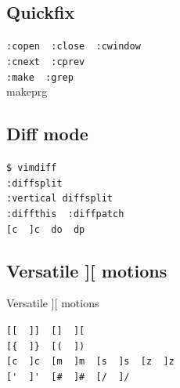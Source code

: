 \documentclass[14pt,svgnames,compress]{beamer}
\newcommand\hl[1]{\textcolor{HlColor}{#1}}
\newcommand\framesubtitlefontsize{\huge}
\newcommand\singleframesubtitle[1]{
    \begin{center}
        \framesubtitlefontsize #1
    \end{center}
}
\newcommand\subtitleframe{
    \begin{frame}
        \singleframesubtitle{\insertsubsectionhead}
    \end{frame}
}
\begin{document}
\subsection{Quickfix}

\subtitleframe

\begin{frame}[fragile]
    \begin{spacing}{1.5} %
        \large
        \centering
        \verb|:copen  :close  :cwindow| \\ \bigskip
        \verb|:cnext  :cprev| \\
        \vspace{1cm}
        \verb|:make  :grep| \\ \bigskip
        \hl{makeprg} \\
    \end{spacing}
\end{frame}


\subsection{Diff mode}

\subtitleframe

\begin{frame}[fragile]
    \begin{spacing}{1.5} %
        \large
        \centering
        \verb|$ vimdiff| \\
        \verb|:diffsplit| \\
        \verb|:vertical diffsplit| \\
        \verb|:diffthis  :diffpatch| \\  \vspace{1cm}
        \verb|[c  ]c  do  dp| \\
    \end{spacing}
\end{frame}


\subsection{Versatile ][ motions}

\begin{frame}
    \singleframesubtitle{Versatile \hl{][} motions}
\end{frame}

\begin{frame}[fragile]
    \begin{spacing}{1.5} %
        \Large
        \centering
        \verb|[[  ]]  []  ][| \\ \bigskip
        \verb|[{  ]}  [(  ])| \\ \bigskip
        \verb|[c  ]c  [m  ]m  [s  ]s  [z  ]z| \\ \bigskip
        \verb|['  ]'  [#  ]#  [/  ]/| \\ \bigskip
    \end{spacing}
\end{frame}
\end{document}
